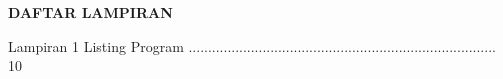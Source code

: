 \newpage %
\begin{center}
\begin{large}\textbf{DAFTAR LAMPIRAN}\\\end{large}
\end{center}
\vspace{5mm} Lampiran 1 Listing Program
...............................................................................
10

